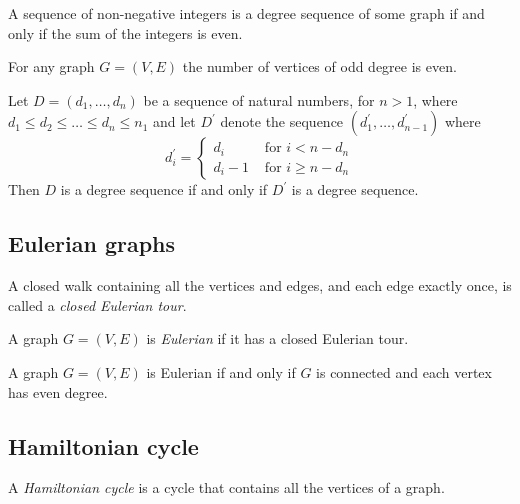 \documentclass{classnotes}
\begin{document}
\begin{remark}
    A sequence of non-negative integers is a degree sequence of some graph if and only if the sum of the integers is even.
\end{remark}

\begin{lemma}
    For any graph $G=(V,E)$ the number of vertices of odd degree is even.
\end{lemma}

\begin{theorem}
    Let $D = (d_1,\dots,d_n)$ be a sequence of natural numbers, for $n > 1$, where $d_1 \le d_2 \le \dots \le d_n \le n_1$ and let $D^\prime$ denote the
    sequence $(d_1^\prime,\dots,d_{n-1}^\prime)$ where 
    $$d_i^\prime = \begin{cases}d_i &\text{ for } i < n-d_n \\ d_i - 1 &\text{ for }i\ge n-d_n\end{cases}$$
    Then $D$ is a degree sequence if and only if $D^\prime$ is a degree sequence.
\end{theorem}

\subsection{Eulerian graphs}
\begin{definition}
    A closed walk containing all the vertices and edges, and each edge exactly once, is called a \emph{closed Eulerian tour}.
\end{definition}

\begin{definition}
    A graph $G=(V,E)$ is \emph{Eulerian} if it has a closed Eulerian tour.
\end{definition}

\begin{theorem}
    A graph $G=(V,E)$ is Eulerian if and only if $G$ is connected and each vertex has even degree.
\end{theorem}

\subsection{Hamiltonian cycle}
\begin{definition}
    A \emph{Hamiltonian cycle} is a cycle that contains all the vertices of a graph.
\end{definition}
\end{document}
